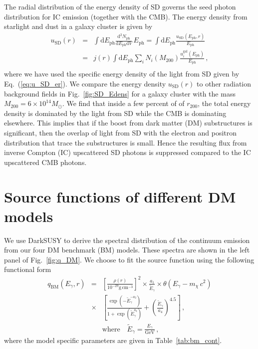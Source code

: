 \documentclass[10pt,aps,pra,reprint,amsmath,amsfonts,amssymb,showpacs,nofootinbib,floatfix]{revtex4-1}
\newcommand{\rmn}{\mathrm}
\newcommand{\ph}{\rmn{ph}}
\newcommand{\eph}{E_\ph}
\newcommand{\gal}{\rmn{gal}}
\newcommand{\sd}{\rmn{SD}}
\newcommand{\msun}{M_\odot}
\newcommand{\cm}{\rmn{cm}}
\newcommand{\egt}{\tilde{E}_\gamma}
\newcommand{\gev}{\rmn{GeV}}
\newcommand{\dd}{\rmn{d}}
\newcommand{\rvir}{r_{200}}
\newcommand{\mvir}{M_{200}}
\newcommand{\eg}{E_\gamma}
\begin{document}
The radial distribution of the energy density of SD governs the seed
photon distribution for IC emission (together with the CMB).  The
energy density from starlight and dust in a galaxy cluster is given by
\begin{eqnarray}
\label{eq:u_SD_r}
u_\sd(r) &=& \int \dd \eph \frac{\dd^2 N_\ph}{\dd \eph \dd V}\,\eph
=\int \dd \eph \frac{u_\sd(\eph, r)}{\eph}
\nonumber \\
&=&  j(r)  \int \dd \eph \sum_i 
N_i(\mvir) \frac{u_i^\gal(\eph)}{\eph}\,, \nonumber \\
\end{eqnarray}
where we have used the specific energy density of the light from SD
given by Eq.~(\ref{eq:u_SD_er}). We compare the energy
density $u_\sd(r)$ to other radiation background fields in
Fig.~\ref{fig:SD_Edens} for a galaxy cluster with the mass
$\mvir=6\times10^{14}\msun$. We find that inside a few percent of of
$\rvir$, the total energy density is dominated by the light from SD
while the CMB is dominating elsewhere. This implies that if the boost
from dark matter (DM) substructures is significant, then the overlap of
light from SD with the electron and positron distribution that trace
the substructures is small. Hence the resulting flux from inverse
Compton (IC) upscattered SD photons is suppressed compared to the IC
upscattered CMB photons.


\section{Source functions of different DM models}
We use {\sc DarkSUSY} to derive the spectral distribution of the
continuum emission from our four DM benchmark (BM) models. These
spectra are shown in the left panel of Fig.~\ref{fig:q_DM}. We choose
to fit the source function using the following functional form
\begin{eqnarray}
q_\rmn{BM} (\eg,r)&=&\left[\frac{\rho(r)}{10^{-29}\rmn{g}\,\cm^{-3}}\right]^2
\times\frac{a_1}{\egt}\times\theta(\eg-m_\chi\,c^2)\nonumber\\
&\times&\left[\frac{\exp\left(-\egt^{-a_2}\right)}{1+\exp\left(\egt^{a_3}\right)}
+\left(\frac{\egt}{a_4}\right)^{4.5}\right]\,, \nonumber\\
&&\rmn{where}\quad \egt = \frac{\eg}{\gev}\,,
 \label{eq:bm_cont}
\end{eqnarray}
where the model specific parameters are given in
Table~\ref{tab:bm_cont}.
\end{document}
